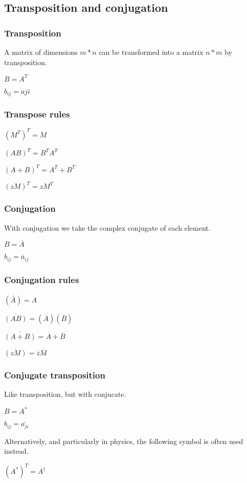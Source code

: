 
\subsection{Transposition and conjugation}

\subsubsection{Transposition}

A matrix of dimensions \(m*n\) can be transformed into a matrix \(n*m\) by transposition.

\(B=A^T\)

\(b_{ij}=a{ji}\)

\subsubsection{Transpose rules}

\((M^T)^T=M\)

\((AB)^T=B^TA^T\)

\((A+B)^T=A^T+B^T\)

\((zM)^T=zM^T\)

\subsubsection{Conjugation}

With conjugation we take the complex conjugate of each element.

\(B=\overline A\)

\(b_{ij}=\overline a_{ij}\)

\subsubsection{Conjugation rules}

\(\overline {(\overline A)}=A\)

\(\overline {(AB)}=(\overline A)( \overline B)\)

\(\overline {(A+B)}=\overline A+\overline B\)

\(\overline {(zM)}=\overline z \overline M\)

\subsubsection{Conjugate transposition}

Like transposition, but with conjucate.

\(B=A^*\)

\(b_{ij}=\bar{a_{ji}}\)

Alternatively, and particularly in physics, the following symbol is often used instead.

\((A^*)^T=A^\dagger\)

